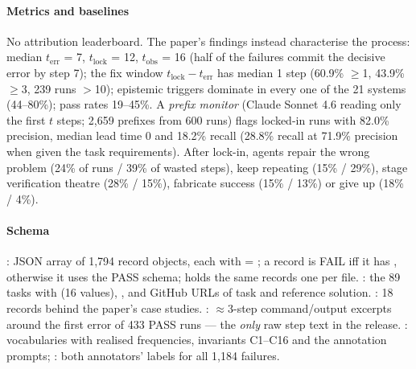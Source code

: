 \paragraph{Metrics and baselines} No attribution leaderboard. The paper's findings instead characterise the process: median $t_{\mathrm{err}}$ = 7, $t_{\mathrm{lock}}$ = 12, $t_{\mathrm{obs}}$ = 16 (half of the failures commit the decisive error by step 7); the fix window $t_{\mathrm{lock}}-t_{\mathrm{err}}$ has median 1 step (60.9\% $\ge$1, 43.9\% $\ge$3, 239 runs $>$10); epistemic triggers dominate in every one of the 21 systems (44--80\%); pass rates 19--45\%. A \emph{prefix monitor} (Claude Sonnet 4.6 reading only the first $t$ steps; 2,659 prefixes from 600 runs) flags locked-in runs with 82.0\% precision, median lead time 0 and 18.2\% recall (28.8\% recall at 71.9\% precision when given the task requirements). After lock-in, agents repair the wrong problem (24\% of runs / 39\% of wasted steps), keep repeating (15\% / 29\%), stage verification theatre (28\% / 15\%), fabricate success (15\% / 13\%) or give up (18\% / 4\%).

\paragraph{Schema} : JSON array of 1,794 record objects, each with  = ; a record is FAIL iff it has , otherwise it uses the PASS schema;  holds the same records one per file. : the 89 tasks with  (16 values), ,  and GitHub URLs of task and reference solution. : 18 records behind the paper's case studies. : $\approx$3-step command/output excerpts around the first error of 433 PASS runs --- the \emph{only} raw step text in the release. : vocabularies with realised frequencies, invariants C1--C16 and the annotation prompts; : both annotators' labels for all 1,184 failures.

